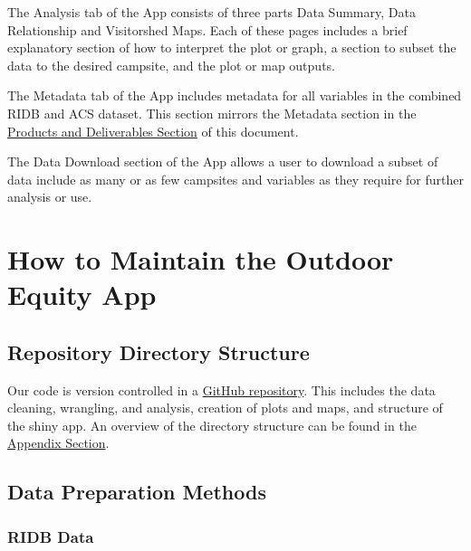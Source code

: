 \documentclass[
  11 pt,
  openany]{book}
\begin{document}
The Analysis tab of the App consists of three parts Data Summary, Data Relationship and Visitorshed Maps. Each of these pages includes a brief explanatory section of how to interpret the plot or graph, a section to subset the data to the desired campsite, and the plot or map outputs.

The Metadata tab of the App includes metadata for all variables in the combined RIDB and ACS dataset. This section mirrors the Metadata section in the \protect\hyperlink{products-and-deliverables}{Products and Deliverables Section} of this document.

The Data Download section of the App allows a user to download a subset of data include as many or as few campsites and variables as they require for further analysis or use.

\hypertarget{how-to-maintain-the-outdoor-equity-app}{%
\section{How to Maintain the Outdoor Equity App}\label{how-to-maintain-the-outdoor-equity-app}}

\hypertarget{repository-directory-structure}{%
\subsection{Repository Directory Structure}\label{repository-directory-structure}}

Our code is version controlled in a \href{https://github.com/outdoor-equity/outdoor-equity}{GitHub repository}. This includes the data cleaning, wrangling, and analysis, creation of plots and maps, and structure of the shiny app. An overview of the directory structure can be found in the \protect\hyperlink{repository-directory-structure-1}{Appendix Section}.

\hypertarget{data-preparation-methods}{%
\subsection{Data Preparation Methods}\label{data-preparation-methods}}

\hypertarget{ridb-data}{%
\subsubsection{RIDB Data}\label{ridb-data}}
\end{document}
